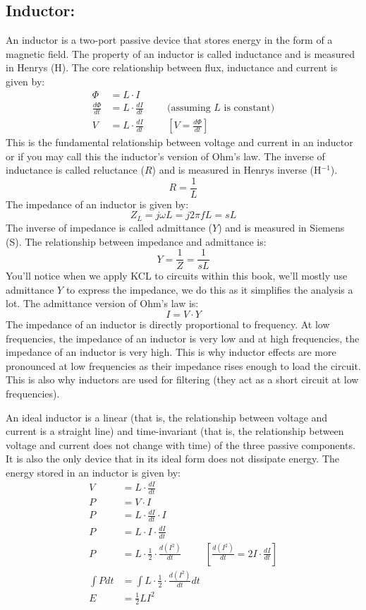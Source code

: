 \subsection{Inductor:}
An inductor is a two-port passive device that stores energy in the form of
a magnetic field. The property of an inductor is called inductance and is
measured in Henrys (H). The core relationship between flux, inductance
and current is given by:
\begin{align*}
  \Phi &= L \cdot I \\
  \frac{d\Phi}{dt} &= L \cdot \frac{dI}{dt} \hspace{1cm} \text{(assuming \(L\) is constant)} \\
  V &= L \cdot \frac{dI}{dt} \hspace{1cm} [V = \frac{d\Phi}{dt}]
\end{align*}
This is the fundamental relationship between voltage and current in an
inductor or if you may call this the inductor's version of Ohm's law.
The inverse of inductance is called reluctance (\(R\)) and is measured in
Henrys inverse (H\(^{-1}\)).
\[
  R = \frac{1}{L}
\]
The impedance of an inductor is given by:
\[
  Z_L = j\omega L = j 2 \pi f L = s L
\]
The inverse of impedance is called admittance (\(Y\)) and is measured in
Siemens (S). The relationship between impedance and admittance is:
\[
  Y = \frac{1}{Z} = \frac{1}{sL}
\]
You'll notice when we apply KCL to circuits within this book, we'll mostly
use admittance \(Y\) to express the impedance, we do this as it simplifies
the analysis a lot. The admittance version of Ohm's law is:
\[
  I = V \cdot Y
\]
The impedance of an inductor is directly proportional to frequency. At low
frequencies, the impedance of an inductor is very low and at high frequencies,
the impedance of an inductor is very high. This is why inductor effects are
more pronounced at low frequencies as their impedance rises enough to load
the circuit. This is also why inductors are used for filtering (they act as
a short circuit at low frequencies).

An ideal inductor is a linear (that is, the relationship between voltage and
current is a straight line) and time-invariant (that is, the relationship
between voltage and current does not change with time) of the three passive
components. It is also the only device that in its ideal form does not
dissipate energy. The energy stored in an inductor is given by:
\begin{align*}
  V &= L \cdot \frac{dI}{dt} \\
  P &= V \cdot I \\
  P &= L \cdot \frac{dI}{dt} \cdot I \\
  P &= L \cdot I \cdot \frac{dI}{dt} \\
  P &= L \cdot \frac{1}{2} \cdot \frac{d(I^2)}{dt} \hspace{1cm} [\frac{d(I^2)}{dt} = 2I \cdot \frac{dI}{dt}] \\
  \int P dt &= \int L \cdot \frac{1}{2} \cdot \frac{d(I^2)}{dt} dt \\
  E &= \frac{1}{2} L I^2
\end{align*}

